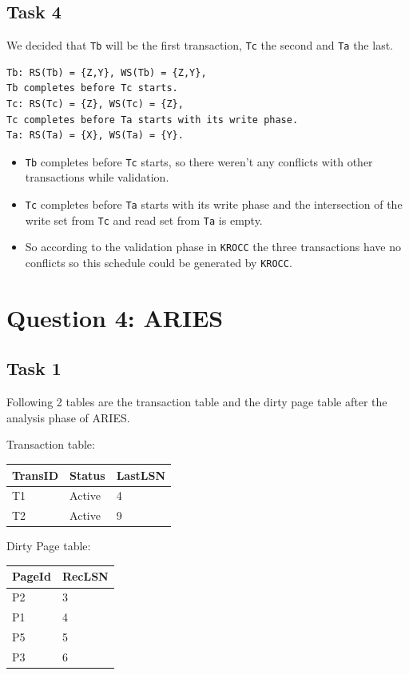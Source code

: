 \documentclass[12pt,a4paper]{article}
\begin{document}
\subsection{Task 4}
We decided that \texttt{Tb} will be the first transaction, \texttt{Tc} the second and \texttt{Ta} the last.
\begin{verbatim}
Tb: RS(Tb) = {Z,Y}, WS(Tb) = {Z,Y},
Tb completes before Tc starts.
Tc: RS(Tc) = {Z}, WS(Tc) = {Z},
Tc completes before Ta starts with its write phase.
Ta: RS(Ta) = {X}, WS(Ta) = {Y}.
\end{verbatim}

\begin{itemize}
	\item \texttt{Tb} completes before \texttt{Tc} starts, so there weren't any conflicts with other transactions while validation.	
	\item \texttt{Tc} completes before \texttt{Ta} starts with its write phase and the intersection of the write set from \texttt{Tc} and read set from \texttt{Ta} is empty.
	\item So according to the validation phase in \texttt{KROCC} the three transactions have no conflicts so this schedule could be generated by \texttt{KROCC}.
\end{itemize}

\section{Question 4: ARIES}

\subsection{Task 1}
Following 2 tables are the transaction table and the dirty page table after the analysis phase of ARIES.

Transaction table:
\begin{table}[!htbp]
    \centering
    \begin{tabularx}{\textwidth}{l|l|l}
        \hline
        TransID & Status & LastLSN \\ 
        \hline
        T1 & Active & 4 \\
        T2 & Active & 9 \\         
        \hline
    \end{tabularx}
\end{table}

Dirty Page table:
\begin{table}[!htbp]
    \centering
    \begin{tabularx}{\textwidth}{l|l}
        \hline
        PageId & RecLSN \\ 
        \hline
        P2 & 3 \\
        P1 & 4 \\
        P5 & 5 \\
        P3 & 6 \\         
        \hline
    \end{tabularx}
\end{table}
\end{document}
